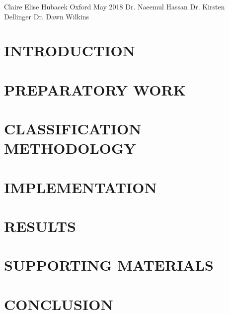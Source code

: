 \documentclass{report}
\begin{document}
{Claire Elise Hubacek}
{Oxford}
{May 2018}
{Dr. Naeemul Hassan}
{Dr. Kirsten Dellinger}
{Dr. Dawn Wilkins}

\initializefrontsections
{}

\startacknowledgementspage{

}

\startabstractpage {

}

\producetableofcontents{}
\listoffigures
\listoftables
\listofabbreviations

\startthechapters

\chapter{INTRODUCTION}{

}

\chapter{PREPARATORY WORK}{

}

\chapter{CLASSIFICATION METHODOLOGY}{

}

\chapter{IMPLEMENTATION}{

}

\chapter{RESULTS}{

}

\chapter{SUPPORTING MATERIALS}{

}

\chapter{CONCLUSION}{

}

\startbibliography



\end{document}
